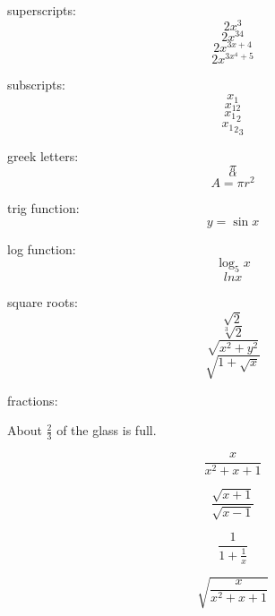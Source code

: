 \documentclass[11pt]{article}
\begin{document}
superscripts: $$2x^3$$
$$2x^{34}$$
$$2x^{3x+4}$$
$$2x^{3x^4+5}$$

subscripts:
$$x_1$$
$$x_{12}$$
$${x_1}_2$$
$${{x_1}_2}_3$$

greek letters:
$$\pi$$
$$\alpha$$
$$A=\pi r^2$$

trig function:
$$y=\sin{x}$$

log function:
$$\log_5{x}$$
$$ln{x}$$

square roots:
$$\sqrt{2}$$
$$\sqrt[3]{2}$$
$$\sqrt{x^2 + y^2}$$
$$\sqrt{1+\sqrt{x}}$$

fractions:

About $\displaystyle{\frac{2}{3}}$ of the glass is full.

$$\frac{x}{x^2+x+1}$$

$$\frac{\sqrt{x+1}}{\sqrt{x-1}}$$

$$\frac{1}{1+\frac{1}{x}}$$


$$\sqrt{\frac{x}{x^2+x+1}}$$
\end{document}
